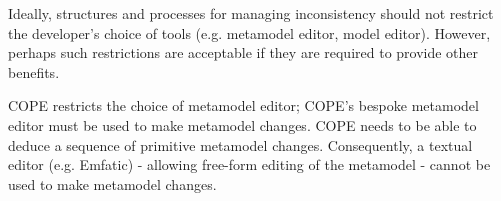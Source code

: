 \documentclass[a4paper]{article}
\begin{document}
Ideally, structures and processes for managing inconsistency should not restrict the developer's choice of tools (e.g. metamodel editor, model editor). However, perhaps such restrictions are acceptable if they are required to provide other benefits.

COPE restricts the choice of metamodel editor; COPE’s bespoke metamodel editor must be used to make metamodel changes. COPE needs to be able to deduce a sequence of primitive metamodel changes. Consequently, a textual editor (e.g. Emfatic) - allowing free-form editing of the metamodel - cannot be used to make metamodel changes.
\end{document}
